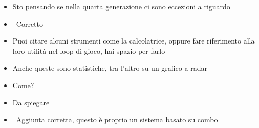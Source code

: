 {\begin{itemize}
  \item {} Sto pensando se nella quarta generazione ci sono eccezioni a riguardo
  \item {} \rvBene\ Corretto
  \item {} Puoi citare alcuni strumenti come la calcolatrice, oppure fare riferimento alla loro utilità nel loop di gioco, hai spazio per farlo
  \item {} Anche queste sono statistiche, tra l'altro su un grafico a radar
  \item {} Come?
  \item {} Da spiegare
  \item {} \rvBene\ Aggiunta corretta, questo è proprio un sistema basato su combo
\end{itemize}
}

